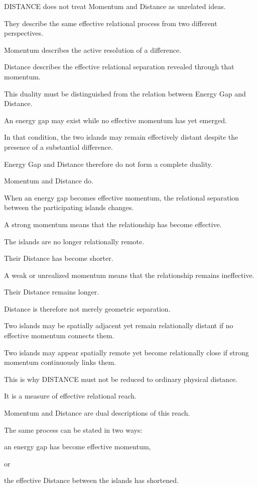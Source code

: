 DISTANCE does not treat Momentum and Distance as unrelated ideas.

They describe the same effective relational process from two different perspectives.

Momentum describes the active resolution of a difference.

Distance describes the effective relational separation revealed through that momentum.

This duality must be distinguished from the relation between Energy Gap and Distance.

An energy gap may exist while no effective momentum has yet emerged.

In that condition, the two islands may remain effectively distant despite the presence of a substantial difference.

Energy Gap and Distance therefore do not form a complete duality.

Momentum and Distance do.

When an energy gap becomes effective momentum, the relational separation between the participating islands changes.

A strong momentum means that the relationship has become effective.

The islands are no longer relationally remote.

Their Distance has become shorter.

A weak or unrealized momentum means that the relationship remains ineffective.

Their Distance remains longer.

Distance is therefore not merely geometric separation.

Two islands may be spatially adjacent yet remain relationally distant if no effective momentum connects them.

Two islands may appear spatially remote yet become relationally close if strong momentum continuously links them.

This is why DISTANCE must not be reduced to ordinary physical distance.

It is a measure of effective relational reach.

Momentum and Distance are dual descriptions of this reach.

The same process can be stated in two ways:

an energy gap has become effective momentum,

or

the effective Distance between the islands has shortened.

